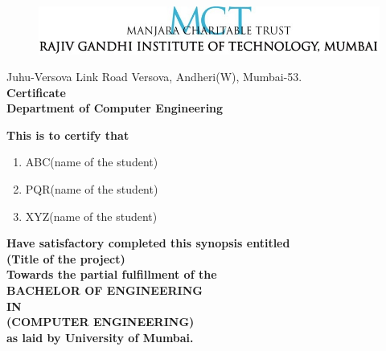 \thispagestyle{empty}
\vspace*{0.025cm}
\begin{center}
\begin{figure}[h]
\centering
\includegraphics[scale=0.8]{college_logo.jpg}
\end{figure}
\vspace{0cm}
Juhu-Versova Link Road Versova, Andheri(W), Mumbai-53.\\
\vspace{1cm}
\huge\textbf{Certificate}\\
\vspace{0.25cm}
\hspace{.05cm}
\large\textbf {Department of Computer Engineering}\\
\end{center}
\vspace{0.50cm}
\begin{center}
\textbf{This is to certify that}\\
\end{center}
\vspace{0cm}

\begin{enumerate}
\item \begin{center}ABC(name of the student)\end{center}
\item \begin{center}PQR(name of the student)\end{center}
\item \begin{center}XYZ(name of the student)
\end{center}
\end{enumerate}




\begin{center}
\textbf{Have satisfactory completed this synopsis entitled}\\
\vspace{0.70cm}
{\Large\textbf {(Title of the project)}} \\
\vspace{0.50cm}
\textbf{Towards the partial fulfillment of the}\\
\vspace{0.20cm}
\textbf{BACHELOR OF ENGINEERING}\\
\textbf{IN}\\
\textbf{(COMPUTER ENGINEERING)}\\
\vspace{0.20cm}
\textbf{as laid by University of Mumbai.}\\
\end{center}
\vspace{1cm}


